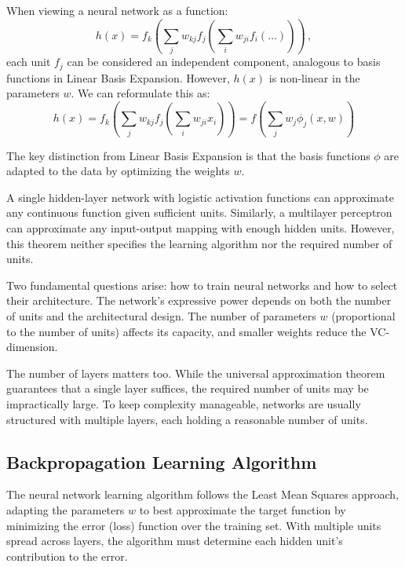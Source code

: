 When viewing a neural network as a function:
\begin{equation*}
    h(x) = f_k\left(\sum_j w_{kj} f_j \left(\sum_i w_{ji} f_i(\ldots)\right)\right) \, ,
\end{equation*}
each unit $f_j$ can be considered an independent component, analogous to basis functions in Linear Basis Expansion. However, $h(x)$ is non-linear in the parameters $w$. We can reformulate this as:
\begin{equation*}
    h(x) = f_k\left(\sum_j w_{kj} f_j \left(\sum_i w_{ji} x_i\right)\right) = f\left(\sum_j w_j \phi_j(x,w)\right)
\end{equation*}

The key distinction from Linear Basis Expansion is that the basis functions $\phi$ are adapted to the data by optimizing the weights $w$.

\begin{theorem}
A single hidden-layer network with logistic activation functions can approximate any continuous function given sufficient units. Similarly, a multilayer perceptron can approximate any input-output mapping with enough hidden units. However, this theorem neither specifies the learning algorithm nor the required number of units.
\end{theorem}

Two fundamental questions arise: how to train neural networks and how to select their architecture. The network's expressive power depends on both the number of units and the architectural design. The number of parameters $w$ (proportional to the number of units) affects its capacity, and smaller weights reduce the VC-dimension.

The number of layers matters too. While the universal approximation theorem guarantees that a single layer suffices, the required number of units may be impractically large. To keep complexity manageable, networks are usually structured with multiple layers, each holding a reasonable number of units.

\subsection{Backpropagation Learning Algorithm}

The neural network learning algorithm follows the Least Mean Squares approach, adapting the parameters $w$ to best approximate the target function by minimizing the error (loss) function over the training set. With multiple units spread across layers, the algorithm must determine each hidden unit's contribution to the error.

